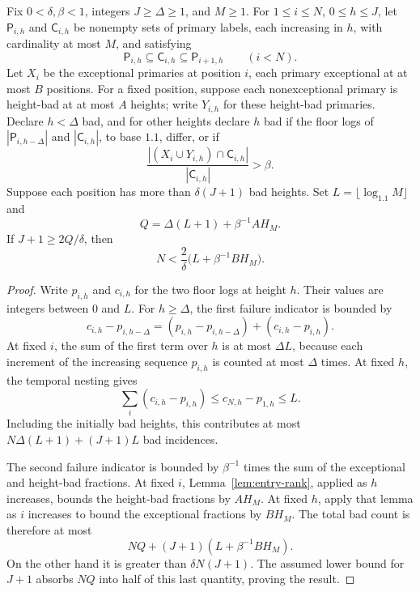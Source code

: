 \begin{lemma}
\label{lem:bad-density-chain}
Fix \(0<\delta,\beta<1\), integers \(J\ge\Delta\ge1\), and \(M\ge1\).
For \(1\le i\le N\), \(0\le h\le J\), let
\(\mathsf P_{i,h}\) and \(\mathsf C_{i,h}\) be nonempty sets of
primary labels, each increasing in \(h\), with cardinality at most
\(M\), and satisfying
\[
 \mathsf P_{i,h}\subseteq\mathsf C_{i,h}
       \subseteq\mathsf P_{i+1,h}\qquad(i<N).
\]
Let \(X_i\) be the exceptional primaries at position \(i\), each
primary exceptional at at most \(B\) positions.
For a fixed position, suppose each nonexceptional primary is
height-bad at at most \(A\) heights; write \(Y_{i,h}\) for these
height-bad primaries.
Declare \(h<\Delta\) bad, and for other heights declare \(h\) bad
if the floor logs of
\(|\mathsf P_{i,h-\Delta}|\) and \(|\mathsf C_{i,h}|\), to base
\(1.1\), differ, or if
\[
 \frac{|(X_i\cup Y_{i,h})\cap\mathsf C_{i,h}|}
      {|\mathsf C_{i,h}|}>\beta.
\]
Suppose each position has more than \(\delta(J+1)\) bad heights.
Set \(L=\lfloor\log_{1.1}M\rfloor\) and
\[
 Q=\Delta(L+1)+\beta^{-1}AH_M.
\]
If \(J+1\ge2Q/\delta\), then
\[
 N<\frac2\delta\bigl(L+\beta^{-1}BH_M\bigr).
\]
\end{lemma}

\begin{proof}
Write \(p_{i,h}\) and \(c_{i,h}\) for the two floor logs at height
\(h\).  Their values are integers between \(0\) and \(L\).
For \(h\ge\Delta\), the first failure indicator is bounded by
\[
 c_{i,h}-p_{i,h-\Delta}
 =(p_{i,h}-p_{i,h-\Delta})+(c_{i,h}-p_{i,h}).
\]
At fixed \(i\), the sum of the first term over \(h\) is at most
\(\Delta L\), because each increment of the increasing sequence
\(p_{i,h}\) is counted at most \(\Delta\) times.
At fixed \(h\), the temporal nesting gives
\[
 \sum_i(c_{i,h}-p_{i,h})
      \le c_{N,h}-p_{1,h}\le L.
\]
Including the initially bad heights, this contributes at most
\(N\Delta(L+1)+(J+1)L\) bad incidences.

The second failure indicator is bounded by \(\beta^{-1}\) times
the sum of the exceptional and height-bad fractions.
At fixed \(i\), Lemma~\ref{lem:entry-rank}, applied as \(h\)
increases, bounds the height-bad fractions by \(AH_M\).
At fixed \(h\), apply that lemma as \(i\) increases to bound the
exceptional fractions by \(BH_M\).
The total bad count is therefore at most
\[
 NQ+(J+1)(L+\beta^{-1}BH_M).
\]
On the other hand it is greater than \(\delta N(J+1)\).
The assumed lower bound for \(J+1\) absorbs \(NQ\) into half of
this last quantity, proving the result.
\end{proof}

